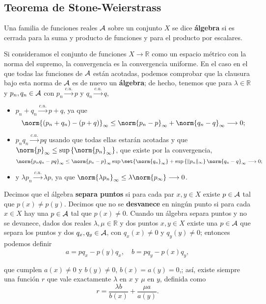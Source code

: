 \documentclass[11pt]{article}
\theoremstyle{plain}
\theoremstyle{definition}
\theoremstyle{remark}
\begin{document}
\subsection{Teorema de Stone-Weierstrass}

Una familia de funciones reales ${\cal A}$ sobre un conjunto $X$ se dice
\textbf{álgebra} si es cerrada para la suma y producto de funciones y
para el producto por escalares. 

Si consideramos el conjunto de funciones $X \to \mathbb{R}$ como un
espacio métrico con la norma del supremo, la convergencia es la
convergencia uniforme. En el caso en el que todas las funciones
de ${\cal A}$ están acotadas, podemos comprobar que la clausura bajo esta
norma de ${\cal A}$ es de nuevo un \textbf{álgebra}; de hecho, tenemos que para
$\lambda \in \mathbb{R}$ y $p_n,q_n \in {\cal A}$ con $p_n \overset{c.u.}\longrightarrow p$ y $q_n \overset{c.u.}\longrightarrow q$,

\begin{itemize}
\item $p_n + q_n \overset{c.u.}\longrightarrow p + q$, ya que
   \[
   \norm{(p_n + q_n) - (p + q)}_{\infty} \leq
   \norm{p_n - p}_{\infty} + \norm{q_n - q}_{\infty} \longrightarrow 0;
   \]
\item $p_nq_n \overset{c.u.}\longrightarrow pq$ usando que todas ellas estarán acotadas y
      que $\norm{p}_{\infty} \leq \sup \left\{ \norm{p_n}_{\infty} \right\}$, que existe por la convergencia,
   \[
   \norm{p_nq_n - pq}_{\infty} \leq
   \norm{p_n - p}_{\infty}\sup\set{\norm{q_n}_{\infty}} + 
   \sup \left\{ \|p_n\|_{\infty} \right\} \norm{q_n-q}_{\infty} \longrightarrow 0;
   \]
\item y $\lambda p_n \overset{c.u.}\longrightarrow \lambda p$, ya que $\norm{\lambda p_n}_{\infty} \leq \lambda\norm{p_{\infty}} \longrightarrow 0$.
\end{itemize}

Decimos que el álgebra \textbf{separa puntos} si para cada par $x,y \in X$
existe $p \in {\cal A}$ tal que $p(x) \neq p(y)$. Decimos que no se \textbf{desvanece}
en ningún punto si para cada $x \in X$ hay una $p \in {\cal A}$ tal que $p(x) \neq 0$.
Cuando un álgebra separa puntos y no se devanece, dados dos reales
$\lambda,\mu \in \mathbb{R}$ y dos puntos $x,y \in X$ existe una $p \in {\cal A}$ que separa
los puntos y dos $q_x,q_y \in {\cal A}$, con $q_x(x) \neq 0$ y $q_y(y) \neq 0$; entonces
podemos definir
\[
a = pq_x - p(y)q_x, \quad
b = pq_y - p(x)q_y, 
\]

que cumplen $a(x) \neq 0$ y $b(y) \neq 0$, $b(x) = a(y) = 0$,; así, existe
siempre una función $r$ que vale exactamente $\lambda$ en $x$ y $\mu$ en $y$,
definida como
\[
r = \frac{\lambda b}{b(x)} + \frac{\mu a}{a(y)}.
\]
\end{document}

